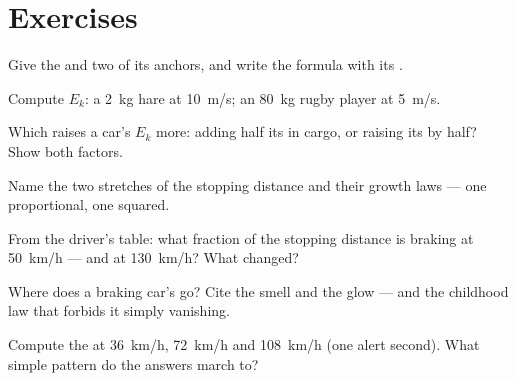 \section{Exercises}

\begin{exercise}[$\star$]\label{exo:g9:kinetic-energy-safety:1}
Give the   and two of its anchors, and write the
 formula with its .
\end{exercise}

\begin{exercise}[$\star$]\label{exo:g9:kinetic-energy-safety:2}
Compute $E_k$: a \qty{2}{kg} hare at \qty{10}{m/s}; an
\qty{80}{kg} rugby player at \qty{5}{m/s}.
\end{exercise}

\begin{exercise}[$\star$]\label{exo:g9:kinetic-energy-safety:3}
Which raises a car's $E_k$ more: adding half its  in
cargo, or raising its  by half? Show both factors.
\end{exercise}

\begin{exercise}[$\star$]\label{exo:g9:kinetic-energy-safety:4}
Name the two stretches of the stopping distance and their
growth laws --- one proportional, one squared.
\end{exercise}

\begin{exercise}[$\star$]\label{exo:g9:kinetic-energy-safety:5}
From the driver's table: what fraction of the stopping
distance is braking at \qty{50}{km/h} --- and at
\qty{130}{km/h}? What changed?
\end{exercise}

\begin{exercise}[$\star$]\label{exo:g9:kinetic-energy-safety:6}
Where does a braking car's  go? Cite the smell
and the glow --- and the childhood law that forbids it
simply vanishing.
\end{exercise}

\begin{exercise}[$\star$]\label{exo:g9:kinetic-energy-safety:7}
Compute the  at \qty{36}{km/h},
\qty{72}{km/h} and \qty{108}{km/h} (one alert second). What
simple pattern do the answers march to?
\end{exercise}

